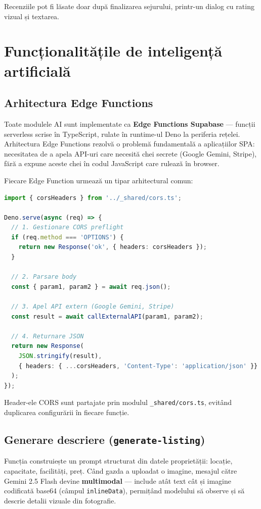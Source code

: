 \documentclass[12pt,a4paper,oneside]{report}
\begin{document}
Recenziile pot fi lăsate doar după finalizarea sejurului, printr-un dialog cu rating vizual și textarea.


\section{Funcționalitățile de inteligență artificială}

\subsection{Arhitectura Edge Functions}

Toate modulele AI sunt implementate ca \textbf{Edge Functions Supabase} — funcții serverless scrise în TypeScript, rulate în runtime-ul Deno la periferia rețelei. Arhitectura Edge Functions rezolvă o problemă fundamentală a aplicațiilor SPA: necesitatea de a apela API-uri care necesită chei secrete (Google Gemini, Stripe), fără a expune aceste chei în codul JavaScript care rulează în browser.

Fiecare Edge Function urmează un tipar arhitectural comun:

\begin{lstlisting}[language=TypeScript, caption={Structura generală a unei Edge Function Supabase}]
import { corsHeaders } from '../_shared/cors.ts';

Deno.serve(async (req) => {
  // 1. Gestionare CORS preflight
  if (req.method === 'OPTIONS') {
    return new Response('ok', { headers: corsHeaders });
  }

  // 2. Parsare body
  const { param1, param2 } = await req.json();

  // 3. Apel API extern (Google Gemini, Stripe)
  const result = await callExternalAPI(param1, param2);

  // 4. Returnare JSON
  return new Response(
    JSON.stringify(result),
    { headers: { ...corsHeaders, 'Content-Type': 'application/json' }}
  );
});
\end{lstlisting}

Header-ele CORS sunt partajate prin modulul \texttt{\_shared/cors.ts}, evitând duplicarea configurării în fiecare funcție.

\subsection{Generare descriere (\texttt{generate-listing})}

Funcția construiește un prompt structurat din datele proprietății: locație, capacitate, facilități, preț. Când gazda a uploadat o imagine, mesajul către Gemini 2.5 Flash devine \textbf{multimodal} — include atât text cât și imagine codificată base64 (câmpul \texttt{inlineData}), permițând modelului să observe și să descrie detalii vizuale din fotografie.
\end{document}
